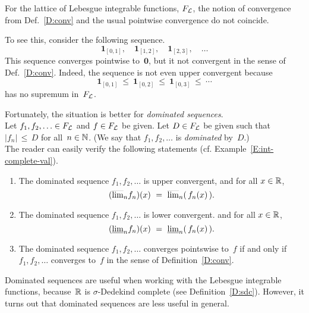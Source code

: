 \documentclass[main.tex]{subfiles}
\begin{document}
\begin{ex}
\label{E:conv_leb}
For the lattice of Lebesgue integrable functions, $F_{\mathcal{L}}$,
the notion of convergence from Def.~\ref{D:conv}
and the usual pointwise convergence 
do not coincide.

To see this,
consider the following sequence.
\begin{equation*}
\mathbf{1}_{[0,1]},\quad \mathbf{1}_{[1,2]},\quad \mathbf{1}_{[2,3]},\quad 
\dotsc
\end{equation*}
This sequence converges pointwise to~$\mathbf{0}$,
but it not convergent in the sense of Def.~\ref{D:conv}.
Indeed, the sequence is not even upper convergent
because 
\begin{equation*}
\mathbf{1}_{[0,1]} 
\ \leq\ \mathbf{1}_{[0,2]} 
\ \leq\ \mathbf{1}_{[0,3]}  \ \leq\ \dotsb
\end{equation*}
has no supremum in~$F_{\mathcal{L}}$.

Fortunately,
the situation is better for \emph{dominated sequences}.\\
Let $f_1,f_2,\dotsc \in F_{\mathcal{L}}$ and $f\in F_{\mathcal{L}}$ be given.
Let $D\in F_{\mathcal{L}}$ be given
such 
that $|f_n|\,\leq\,D$ for all~$n\in\mathbb{N}$.
(We say that $f_1,f_2,\dotsc$ is \emph{dominated} by~$D$.)\\
The reader can easily verify
the following statements
(cf. Example~\ref{E:int-complete-val}).
\begin{enumerate}
\item
\label{E:conv_leb_1}
The dominated sequence $f_1,f_2,\dotsc$
is upper convergent,
and
for all $x\in\mathbb{R}$,
\begin{equation*}
(\ulim{n} f_n)(x) \ =\  \ulim{n}(\,{f_n}(x)\,).
\end{equation*}

\item
\label{E:conv_leb_2}
The dominated sequence $f_1,f_2,\dotsc$
is lower convergent.
and  for all $x\in\mathbb{R}$,
\begin{equation*}
(\llim{n} f_n)(x) \ =\  \llim{n}(\,{f_n}(x)\,).
\end{equation*}

\item
\label{E:conv_leb_3}
The dominated sequence $f_1,f_2,\dotsc$
converges pointswise to~$f$
if and only if
$f_1,f_2,\dotsc$
converges to~$f$ 
in the sense of Definition~\ref{D:conv}.
\end{enumerate}
\end{ex}

\noindent
Dominated sequences
are useful when working with the Lebesgue integrable functions,
because~$\mathbb{R}$ is $\sigma$-Dedekind complete
(see Definition~\ref{D:sdc}).
However, it turns out that dominated sequences
are less useful in general.
\end{document}
